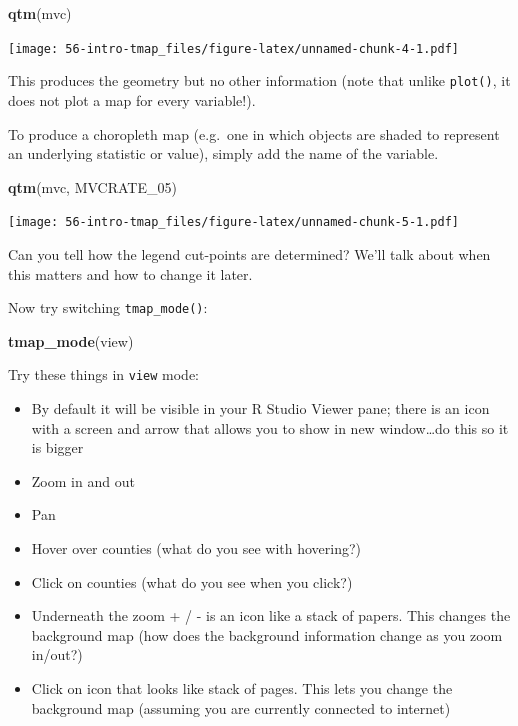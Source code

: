 \documentclass[
]{book}
\newenvironment{Shaded}{\begin{snugshade}}{\end{snugshade}}
\newcommand{\FunctionTok}[1]{\textcolor[rgb]{0.13,0.29,0.53}{\textbf{#1}}}
\newcommand{\NormalTok}[1]{#1}
\newcommand{\StringTok}[1]{\textcolor[rgb]{0.31,0.60,0.02}{#1}}
\providecommand{\tightlist}{%
  \setlength{\itemsep}{0pt}\setlength{\parskip}{0pt}}
\begin{document}
\begin{Shaded}
\begin{Highlighting}[]
\FunctionTok{qtm}\NormalTok{(mvc)}
\end{Highlighting}
\end{Shaded}

\texttt{[image: 56-intro-tmap\_files/figure-latex/unnamed-chunk-4-1.pdf]}

This produces the geometry but no other information (note that unlike \texttt{plot()}, it does not plot a map for every variable!).

To produce a choropleth map (e.g.~one in which objects are shaded to represent an underlying statistic or value), simply add the name of the variable.

\begin{Shaded}
\begin{Highlighting}[]
\FunctionTok{qtm}\NormalTok{(mvc, }\StringTok{\textquotesingle{}MVCRATE\_05\textquotesingle{}}\NormalTok{)}
\end{Highlighting}
\end{Shaded}

\texttt{[image: 56-intro-tmap\_files/figure-latex/unnamed-chunk-5-1.pdf]}

Can you tell how the legend cut-points are determined? We'll talk about when this matters and how to change it later.

Now try switching \texttt{tmap\_mode()}:

\begin{Shaded}
\begin{Highlighting}[]
\FunctionTok{tmap\_mode}\NormalTok{(}\StringTok{\textquotesingle{}view\textquotesingle{}}\NormalTok{)}
\end{Highlighting}
\end{Shaded}

Try these things in \texttt{view} mode:

\begin{itemize}
\tightlist
\item
  By default it will be visible in your R Studio Viewer pane; there is an icon with a screen and arrow that allows you to show in new window\ldots do this so it is bigger
\item
  Zoom in and out
\item
  Pan
\item
  Hover over counties (what do you see with hovering?)
\item
  Click on counties (what do you see when you click?)
\item
  Underneath the zoom + / - is an icon like a stack of papers. This changes the background map (how does the background information change as you zoom in/out?)
\item
  Click on icon that looks like stack of pages. This lets you change the background map (assuming you are currently connected to internet)
\end{itemize}
\end{document}
